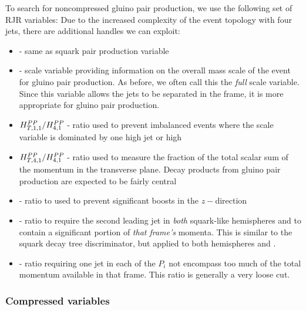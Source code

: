 To search for noncompressed gluino pair production, we use the following set of RJR variables:
Due to the increased complexity of the event topology with four jets, there are additional handles we can exploit:
\begin{itemize}
\item {} - same as squark pair production variable
\item {} - scale variable providing information on the overall mass scale of the event for gluino pair production.  As before, we often call this the \textit{full} scale variable.  Since this variable allows the jets to be separated in the \PP frame, it is more appropriate for gluino pair production.
\item $H^{{PP }}_{T,1,1}/H^{{PP }}_{4,1} $ - ratio used to prevent imbalanced events where the scale variable is dominated by one high \pT jet or high \met
\item $H^{{PP }}_{T,4,1}/H^{{PP }}_{4,1} $ - ratio used to measure the fraction of the total scalar sum of the momentum in the transverse plane.  Decay products from gluino pair production are expected to be fairly central
\item \pzlabratioFour - ratio to used to prevent significant boosts in the $z-$direction
\item \minjTwoGuy - ratio to require the second leading jet in \textit{both} squark-like hemispheres \Ca and \Cb to contain a significant portion of \textit{that frame's} momenta.  This is similar to the \ptjTworatio squark decay tree discriminator, but applied to both hemispheres \Ca and \Cb.
\item \maxjTwoGuy - ratio requiring one jet in each of the $P_i$ not encompass too much of the total momentum available in that frame.  This ratio is generally a very loose cut.
\end{itemize}

\subsubsection{Compressed variables}

